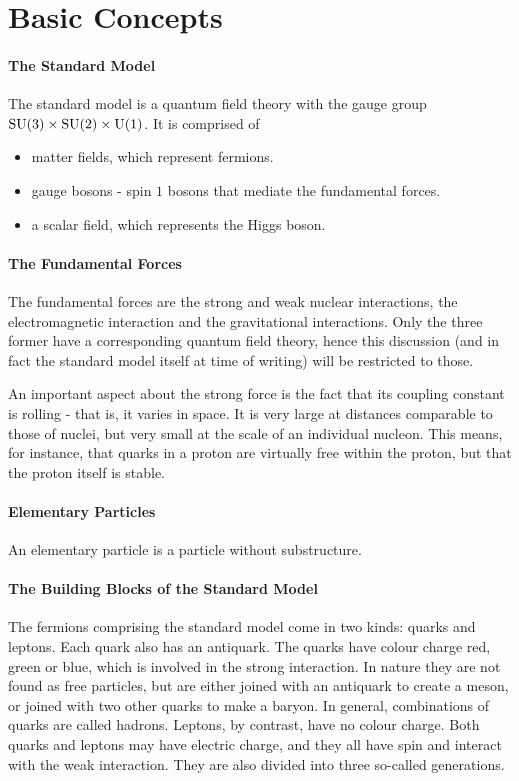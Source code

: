 \section{Basic Concepts}

\paragraph{The Standard Model}
The standard model is a quantum field theory with the gauge group $\text{SU}(3)\times\text{SU}(2)\times\text{U}(1)$. It is comprised of
\begin{itemize}
	\item matter fields, which represent fermions.
	\item gauge bosons - spin $1$ bosons that mediate the fundamental forces.
	\item a scalar field, which represents the Higgs boson.
\end{itemize}

\paragraph{The Fundamental Forces}
The fundamental forces are the strong and weak nuclear interactions, the electromagnetic interaction and the gravitational interactions. Only the three former have a corresponding quantum field theory, hence this discussion (and in fact the standard model itself at time of writing) will be restricted to those.

An important aspect about the strong force is the fact that its coupling constant is rolling - that is, it varies in space. It is very large at distances comparable to those of nuclei, but very small at the scale of an individual nucleon. This means, for instance, that quarks in a proton are virtually free within the proton, but that the proton itself is stable.

\paragraph{Elementary Particles}
An elementary particle is a particle without substructure.

\paragraph{The Building Blocks of the Standard Model}
The fermions comprising the standard model come in two kinds: quarks and leptons. Each quark also has an antiquark. The quarks have colour charge red, green or blue, which is involved in the strong interaction. In nature they are not found as free particles, but are either joined with an antiquark to create a meson, or joined with two other quarks to make a baryon. In general, combinations of quarks are called hadrons. Leptons, by contrast, have no colour charge. Both quarks and leptons may have electric charge, and they all have spin and interact with the weak interaction. They are also divided into three so-called generations.


